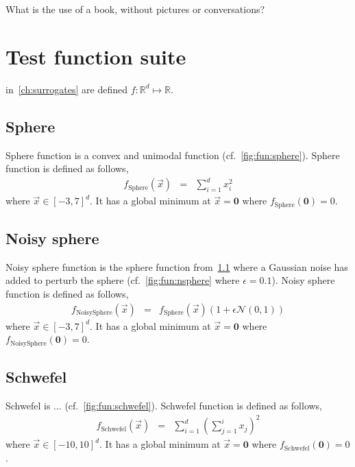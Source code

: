 \begin{savequote}[75mm] 
What is the use of a book, without pictures or conversations?
\end{savequote}

\chapter{Test function suite}\label{app:fun} 
 in~\cref{ch:surrogates} are defined $f:\mathbb{R}^d\mapsto\mathbb{R}$.


\section{Sphere }\label{app:fun:sphere}
Sphere function is a convex and unimodal function (cf.~\cref{fig:fun:sphere}). Sphere function is defined as follows,
\begin{eqnarray}
f_{\textrm{Sphere}}(\vec{x})&=&\sum_{i=1}^d x_i^2
\end{eqnarray} where $\vec{x}\in[-3,7]^d$.
It has a global minimum at $\vec{x}=\textbf{0}$ where $f_{\textrm{Sphere}}(\textbf{0})=0$. 

\section{Noisy sphere}\label{app:fun:nsphere}
Noisy sphere function is the sphere function from~\cref{app:fun:sphere} where a Gaussian noise has added to perturb the sphere (cf.~\cref{fig:fun:nsphere} where $\epsilon=0.1$). Noisy sphere function is defined as follows,
\begin{eqnarray}
f_{\textrm{NoisySphere}}(\vec{x})&=&f_{\textrm{Sphere}}(\vec{x})\left(1+\epsilon\mathcal{N}(0,1)\right)
\end{eqnarray} where $\vec{x}\in[-3,7]^d$.
It has a global minimum at $\vec{x}=\textbf{0}$ where $f_{\textrm{NoisySphere}}(\textbf{0})=0$.

\section{Schwefel}\label{app:fun:schwefel}
Schwefel is ... (cf.~\cref{fig:fun:schwefel}). Schwefel function is defined as follows,
\begin{eqnarray}
f_{\textrm{Schwefel}}(\vec{x})&=&\sum_{i=1}^d\left(\sum_{j=1}^i x_j\right)^2
\end{eqnarray} where $\vec{x}\in[-10,10]^d$.
It has a global minimum at $\vec{x}=\textbf{0}$ where $f_{\textrm{Schwefel}}(\textbf{0})=0$.

